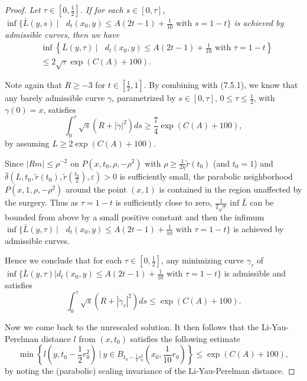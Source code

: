 \begin{proof}
\vskip 0.2cm \emph{Let $\tau\in[0,\frac{1}{2}]$. If for each
$s\in[0,\tau]$, $\inf\{\bar{L}(y,s)\ |\ \mbox{ } d_t(x_0,y)\leq
A(2t-1)+\frac{1}{10}\mbox{ with }s=1-t\}$ is achieved by
admissible curves, then we have
\begin{align}
&\inf\left\{\bar{L}(y,\tau)\ |\ \mbox{ } d_t(x_0,y)
\leq A(2t-1)+\frac{1}{10}\mbox{ with }\tau=1-t\right\}\\
&\leq 2\sqrt{\tau}\exp(C(A)+100). \nonumber  %
\end{align}
}

\vskip 0.1cm Note again that $R \geq -3$ for $t \in
[\frac{1}{2},1]$. By combining with (7.5.1), we know that any
barely admissible curve $\gamma$, parametrized by $s\in[0,\tau]$,
$0\leq \tau \leq \frac{1}{2}$, with $\gamma(0)=x$, satisfies
$$
\int^{\tau}_0\sqrt{s}(R + |\dot{\gamma}|^2)ds \geq
\frac{7}{4}\exp(C(A)+100),
$$
by assuming $L\geq 2\exp(C(A)+100)$.

Since $|Rm|\leq \rho^{-2}$ on $P(x,t_0,\rho,-\rho^{2})$ with
$\rho\geq \frac{1}{2\eta}\widetilde{r}(t_0)$ (and $t_0=1$) and
$\bar{\delta}(L,t_0,\widetilde{r}(t_0),
\widetilde{r}(\frac{t_0}{2}),\varepsilon)>0$ is sufficiently
small, the parabolic neighborhood $P(x,1,\rho,-\rho^2)$ around the
point $(x,1)$ is contained in the region unaffected by the
surgery. Thus as $\tau=1-t$ is sufficiently close to zero,
$\frac{1}{2\sqrt{\tau}}\inf\bar{L}$ can be bounded from above by a
small positive constant and then the infimum
$\inf\{\bar{L}(y,\tau)\ |\ \mbox{ } d_t(x_0,y)\leq
A(2t-1)+\frac{1}{10}\mbox{ with }\tau=1-t\}$ is achieved by
admissible curves.

Hence we conclude that for each $\tau\in [0,\frac{1}{2}]$, any
minimizing curve $\gamma_{\tau}$ of $\inf\{\bar{L}(y,\tau)|\mbox{
} d_t(x_0,y)\leq A(2t-1)+\frac{1}{10}\mbox{ with }\tau=1-t\}$ is
admissible and satisfies
$$
\int^{\tau}_0\sqrt{s}(R+|\dot{\gamma}_{\tau}|^2)ds\leq
\exp(C(A)+100).
$$

Now we come back to the unrescaled solution. It then follows that
the Li-Yau-Perelman distance $l$ from $(x,t_0)$ satisfies the
following estimate \begin{equation} \min\left\{l\left(y,t_0-\frac{1}{2}r^2_0\right)\
\Big|\ y\in
B_{t_0-\frac{1}{2}r^2_0}\left(x_0,\frac{1}{10}r_0\right)\right\}
\leq\exp(C(A)+100), %
\end{equation} by noting the (parabolic) scaling invariance of the
Li-Yau-Perelman distance.


\end{proof}
